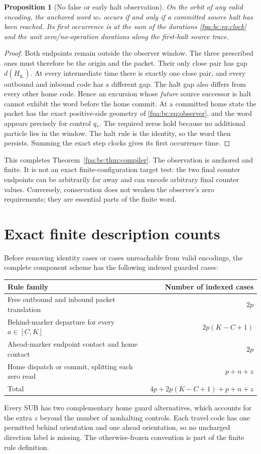 \documentclass[11pt,a4paper]{article}
\numberwithin{equation}{section}
\newtheorem{proposition}[theorem]{Proposition}
\begin{document}
\begin{proposition}[No false or early halt observation]\label{fpa:bc:prop:halt}
On the orbit of any valid encoding, the anchored word $w_*$ occurs if and only
if a committed source halt has been reached. Its first occurrence is at the
sum of the durations \eqref{fpa:bc:eq:clock} and the unit zero/no-operation durations
along the first-halt source trace.
\end{proposition}
\begin{proof}
Both endpoints remain outside the observer window. The three prescribed ones
must therefore be the origin and the packet. Their only close pair has gap
$d(H_{q_*})$. At every intermediate time there is exactly one close pair,
and every outbound and inbound code has a different gap. The halt gap also
differs from every other home code. Hence an excursion whose \emph{future}
source successor is halt cannot exhibit the word before the home commit.
At a committed home state the packet has the exact positive-side geometry
of \eqref{fpa:bc:eq:observer}, and the word appears precisely for control $q_*$.
The required zeros hold because no additional particle lies in the window.
The halt rule is the identity, so the word then persists. Summing the exact
step clocks gives its first occurrence time.
\end{proof}
This completes Theorem~\ref{fpa:bc:thm:compiler}. The observation is anchored and
finite. It is not an exact finite-configuration target test: the two final
counter endpoints can be arbitrarily far away and can encode arbitrary final
counter values. Conversely, conservation does not weaken the observer's zero
requirements; they are essential parts of the finite word.

\section{Exact finite description counts}\label{fpa:bc:sec:counts}
Before removing identity cases or cases unreachable from valid encodings,
the complete component scheme has the following indexed guarded cases:
\begin{center}
\begin{tabular}{lr}
\toprule
Rule family&Number of indexed cases\\
\midrule
Free outbound and inbound packet translation&$2p$\\
Behind-marker departure for every $a\in[C,K]$&$2p(K-C+1)$\\
Ahead-marker endpoint contact and home contact&$2p$\\
Home dispatch or commit, splitting each zero read&$p+n+z$\\
\midrule
Total&$4p+2p(K-C+1)+p+n+z$\\
\bottomrule
\end{tabular}
\end{center}
Every SUB has two complementary home guard alternatives, which accounts for
the extra $z$ beyond the number of nonhalting controls. Each travel code has
one permitted behind orientation and one ahead orientation, so no uncharged
direction label is missing. The otherwise-frozen convention is part of the
finite rule definition.
\end{document}
